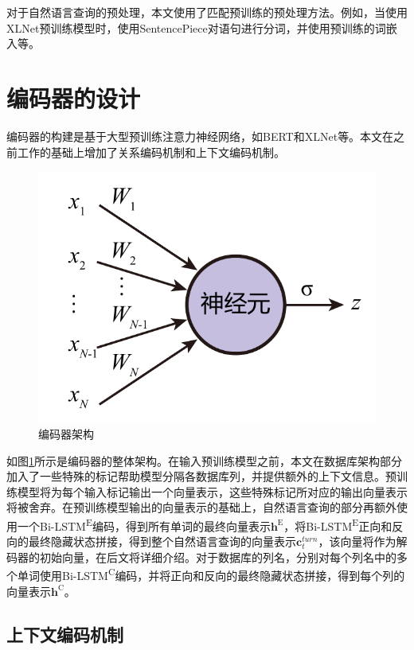 对于自然语言查询的预处理，本文使用了匹配预训练的预处理方法。例如，当使用XLNet\cite{XLNet19}预训练模型时，使用SentencePiece对语句进行分词，并使用预训练的词嵌入等。

\section{编码器的设计}

编码器的构建是基于大型预训练注意力神经网络，如BERT\cite{bert19}和XLNet\cite{XLNet19}等。本文在之前工作的基础上增加了关系编码机制和上下文编码机制。

\begin{figure}[]
    \centering
    \includegraphics[page=7,width=\linewidth]{figure/figures.pdf}
    \caption{编码器架构}
    \label{enc-arch}
\end{figure}

如图\ref{enc-arch}所示是编码器的整体架构。在输入预训练模型之前，本文在数据库架构部分加入了一些特殊的标记帮助模型分隔各数据库列，并提供额外的上下文信息。预训练模型将为每个输入标记输出一个向量表示，这些特殊标记所对应的输出向量表示将被舍弃。在预训练模型输出的向量表示的基础上，自然语言查询的部分再额外使用一个Bi-LSTM\textsuperscript{E}编码，得到所有单词的最终向量表示$\bm{h}^\mathrm{E}$，将Bi-LSTM\textsuperscript{E}正向和反向的最终隐藏状态拼接，得到整个自然语言查询的向量表示$\bm{c}_t^{turn}$，该向量将作为解码器的初始向量，在后文将详细介绍。对于数据库的列名，分别对每个列名中的多个单词使用Bi-LSTM\textsuperscript{C}编码，并将正向和反向的最终隐藏状态拼接，得到每个列的向量表示$\bm{h}^\mathrm{C}$。

\subsection{上下文编码机制}


